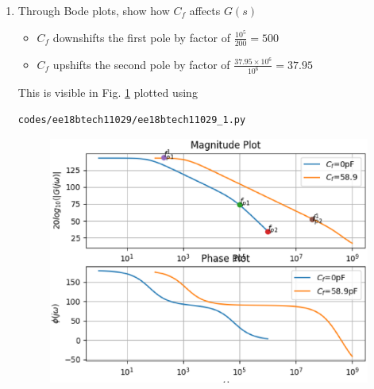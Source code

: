 \begin{enumerate}[label=\thesection.\arabic*.,ref=\thesection.\theenumi]
\item Through Bode plots, show how $C_f$ affects $G(s)$\\
\solution 
%
\begin{itemize}
    \item $C_f$ downshifts the first pole by factor of $\frac{10^{5}}{200}=500$
    \item $C_f$ upshifts the second pole by factor of $\frac{37.95\times10^{6}}{10^{6}}=37.95$
\end{itemize}
%
This is visible in Fig. 	\ref{fig:ee18btech11029_1} plotted using 
\begin{lstlisting}
codes/ee18btech11029/ee18btech11029_1.py
\end{lstlisting}
%
\begin{figure}[!h]
	\centering
		\includegraphics[width=\columnwidth]{./figs/ee18btech11029/feedback.eps}
	\caption{}
	\label{fig:ee18btech11029_1}
\end{figure}


\end{enumerate}
